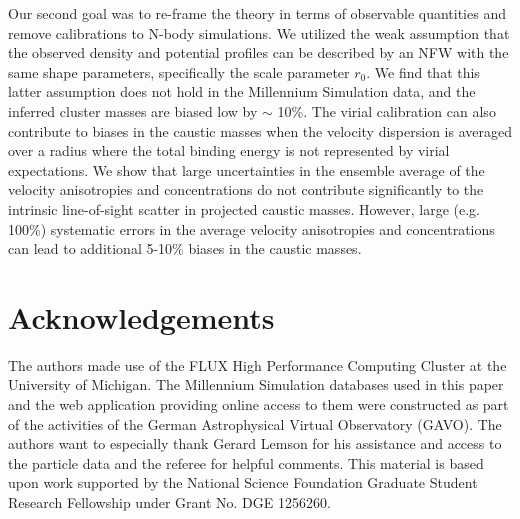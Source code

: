 \documentclass[iop]{emulateapj}
\begin{document}
    Our second goal was to re-frame the theory in terms of observable quantities and remove calibrations to N-body simulations. We utilized the weak assumption that the observed density and potential profiles can be described by an NFW with the same shape parameters, specifically the scale parameter $r_0$. We find that this latter assumption does not hold in the Millennium Simulation data, and the inferred cluster masses are biased low by $\sim$ 10\%. The virial calibration can also contribute to biases in the caustic masses when the velocity dispersion is averaged over a radius where the total binding energy is not represented by virial expectations. We show that large uncertainties in the ensemble average of the velocity anisotropies and concentrations do not contribute significantly to the intrinsic line-of-sight scatter in projected caustic masses.  However, large  (e.g. 100\%) systematic errors in the average velocity anisotropies and concentrations can lead to additional 5-10\% biases in the caustic masses.

\section*{Acknowledgements}
The authors made use of the FLUX High Performance Computing Cluster at the University of Michigan.
The Millennium Simulation databases used in this paper and the web application providing online access to them were constructed as part of the activities of the German Astrophysical Virtual Observatory (GAVO). The authors want to especially thank Gerard Lemson for his assistance and access to the particle data and the referee for helpful comments. This material is based upon work supported by the National Science Foundation Graduate Student Research Fellowship under Grant No. DGE 1256260.
\end{document}
